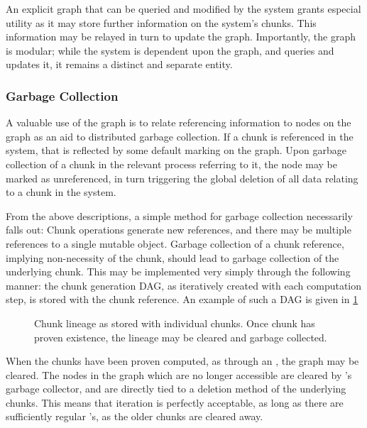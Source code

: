 An explicit graph that can be queried and modified by the system grants especial utility as it may store further information on the system's chunks.
This information may be relayed in turn to update the graph.
Importantly, the graph is modular; while the system is dependent upon the graph, and queries and updates it, it remains a distinct and separate entity.

\subsubsection{Garbage Collection}\label{sec:gc}

A valuable use of the graph is to relate referencing information to nodes on the graph as an aid to distributed garbage collection.
If a chunk is referenced in the system, that is reflected by some default marking on the graph.
Upon garbage collection of a chunk in the relevant \R process referring to it, the node may be marked as unreferenced, in turn triggering the global deletion of all data relating to a chunk in the system.

From the above descriptions, a simple method for garbage collection necessarily falls out:
Chunk operations generate new references, and there may be multiple references to a single mutable object.
Garbage collection of a chunk reference, implying non-necessity of the chunk, should lead to garbage collection of the underlying chunk.
This may be implemented very simply through the following manner: the chunk generation DAG, as iteratively created with each computation step, is stored with the chunk reference.
An example of such a DAG is given in \cref{fig:gc}

\begin{figure}

\caption{Chunk lineage as stored with individual chunks. Once chunk has proven existence, the lineage may be cleared and garbage collected.}
\label{fig:gc}
\end{figure}

When the chunks have been proven computed, as through an , the graph may be cleared.
The nodes in the graph which are no longer accessible are cleared by \R's garbage collector, and are directly tied to a deletion method of the underlying chunks.
This means that iteration is perfectly acceptable, as long as there are sufficiently regular 's, as the older chunks are cleared away.
